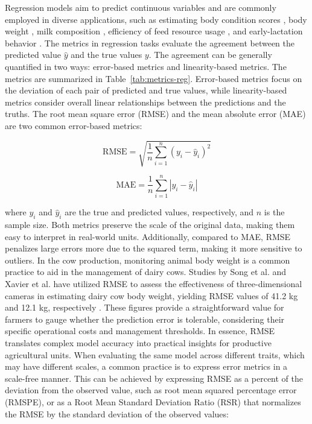 Regression models aim to predict continuous variables and are commonly employed in diverse applications, such as estimating body condition scores \citep{spoliansky_development_2016, yukun_automatic_2019}, body weight \citep{song_automated_2018,xavier_use_2022}, milk composition \citep{rovere_prediction_2021,mota_real-time_2022,mantysaari_body_2019,frizzarin_predicting_2021}, efficiency of feed resource usage \citep{grelet_potential_2020, appuhamy_prediction_2016,de_souza_predicting_2018}, and early-lactation behavior \citep{van_dixhoorn_indicators_2018}. The metrics in regression tasks evaluate the agreement between the predicted value $\hat{y}$ and the true values $y$. The agreement can be generally quantified in two ways: error-based metrics and linearity-based metrics. The metrics are summarized in Table~\ref{tab:metrics-reg}. Error-based metrics focus on the deviation of each pair of predicted and true values, while linearity-based metrics consider overall linear relationships between the predictions and the truths. The root mean square error (RMSE) and the mean absolute error (MAE) are two common error-based metrics:

\begin{equation} \label{eq_rmse}
\text{RMSE} = \sqrt{\frac{1}{n} \sum_{i=1}^{n} (y_i - \hat{y}_i)^2}
\end{equation}

\begin{equation} \label{eq_mae}
    \text{MAE} = \frac{1}{n} \sum_{i=1}^{n} |y_i - \hat{y}_i|
\end{equation}

where $y_i$ and $\hat{y}_i$ are the true and predicted values, respectively, and $n$ is the sample size. Both metrics preserve the scale of the original data, making them easy to interpret in real-world units. Additionally, compared to MAE, RMSE penalizes large errors more due to the squared term, making it more sensitive to outliers. In the cow production, monitoring animal body weight is a common practice to aid in the management of dairy cows. Studies by Song et al. and Xavier et al. have utilized RMSE to assess the effectiveness of three-dimensional cameras in estimating dairy cow body weight, yielding RMSE values of 41.2 kg and 12.1 kg, respectively \citep{song_automated_2018,xavier_use_2022}. These figures provide a straightforward value for farmers to gauge whether the prediction error is tolerable, considering their specific operational costs and management thresholds. In essence, RMSE translates complex model accuracy into practical insights for productive agricultural units.
When evaluating the same model across different traits, which may have different scales, a common practice is to express error metrics in a scale-free manner. This can be achieved by expressing RMSE as a percent of the deviation from the observed value, such as root mean squared percentage error (RMSPE), or as a Root Mean Standard Deviation Ratio (RSR) that normalizes the RMSE by the standard deviation of the observed values:

